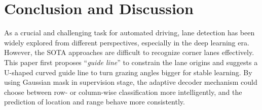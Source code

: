 \documentclass{article}
\begin{document}
\section{Conclusion and Discussion}
\label{sec:concl-disc}
As a crucial and challenging task for automated driving, lane detection has been
widely explored from different perspectives, especially in the deep learning
era. However, the SOTA approaches are difficult to recognize corner lanes
effectively. This paper first proposes ``\emph{guide line}'' to constrain the
lane origins and suggests a U-shaped curved guide line to turn grazing angles
bigger for stable learning. By using Gaussian mask in supervision stage, the
adaptive decoder mechanism could choose between row- or column-wise
classification more intelligently, and the prediction of location and range
behave more consistently.




\end{document}
